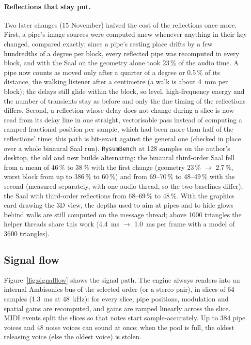 \documentclass[11pt,a4paper,parskip=half,DIV=11,toc=bibliography]{scrartcl}
\newcommand{\fn}[1]{\mbox{\texttt{#1}}}
\begin{document}
\paragraph{Reflections that stay put.} Two later changes (15 November) halved the cost of the reflections once more. First, a pipe's image sources
were computed anew whenever anything in their key changed, compared exactly; since a pipe's resting place drifts by a few hundredths of a degree per
block, every reflected pipe was recomputed in every block, and with the Saal on the geometry alone took 23\,\% of the audio time. A pipe now counts as
moved only after a quarter of a degree or 0.5\,\% of its distance, the walking listener after a centimetre (a walk is about \SI{4}{mm} per block); the
delays still glide within the block, so level, high-frequency energy and the number of transients stay as before and only the fine timing of the
reflections differs. Second, a reflection whose delay does not change during a slice is now read from its delay line in one straight, vectorisable
pass instead of computing a ramped fractional position per sample, which had been more than half of the reflections' time; this path is bit-exact
against the general one (checked in place over a whole binaural Saal run). \fn{RysumBench} at 128 samples on the author's desktop, the old and new
builds alternating: the binaural third-order Saal fell from a mean of 46\,\% to 38\,\% with the first change (geometry 23\,\% $\rightarrow$ 2.7\,\%, worst
block from up to 386\,\% to 60\,\%) and from 69--70\,\% to 48--49\,\% with the second (measured separately, with one audio thread, so the two baselines differ);
the Saal with third-order reflections from 68--69\,\% to 48\,\%. With the graphics card drawing the 3D view, the depths used to aim at pipes and to hide
glows behind walls are still computed on the message thread; above 1000 triangles the helper threads share this work (\SI{4.4}{ms} $\rightarrow$
\SI{1.0}{ms} per frame with a model of 3600 triangles).

\subsection{Signal flow}
Figure~\ref{fig:signalflow} shows the signal path. The engine always renders into an internal
Ambisonics bus of the selected order (or a stereo pair), in slices of 64 samples
(\SI{1.3}{ms} at \SI{48}{kHz}): for every slice, pipe positions, modulation and spatial gains are
recomputed, and gains are ramped linearly across the slice. MIDI events split the slices so that notes
start sample-accurately. Up to 384 pipe voices and 48 noise voices can sound at once; when the pool is
full, the oldest releasing voice (else the oldest voice) is stolen.
\end{document}
